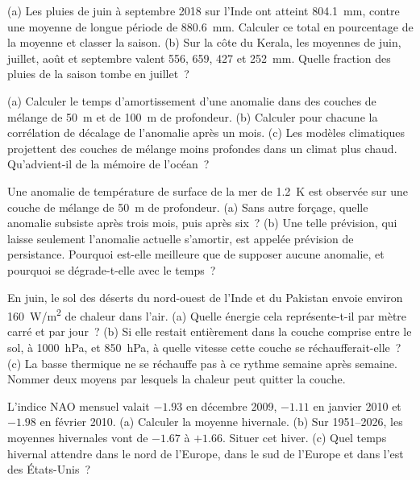 \begin{exercise}[$\star$]\label{exo:b2:climate-variability:4}
(a) Les pluies de juin à septembre 2018 sur l'Inde ont atteint \qty{804.1}{mm}, contre une moyenne de longue période
de \qty{880.6}{mm}. Calculer ce total en pourcentage de la moyenne et classer la saison. (b) Sur la côte du Kerala,
les moyennes de juin, juillet, août et septembre valent 556, 659, 427 et \qty{252}{mm}.
Quelle fraction des pluies de la saison tombe en juillet~?
\end{exercise}

\begin{exercise}[$\star\star$]\label{exo:b2:climate-variability:5}
(a) Calculer le temps d'amortissement d'une anomalie dans des couches de mélange de \qty{50}{m} et de \qty{100}{m} de profondeur.
(b) Calculer pour chacune la corrélation de décalage de l'anomalie après un mois. (c) Les modèles climatiques
projettent des couches de mélange moins profondes dans un climat plus chaud. Qu'advient-il de la mémoire
de l'océan~?
\end{exercise}

\begin{exercise}[$\star\star$]\label{exo:b2:climate-variability:6}
Une anomalie de température de surface de la mer de \qty{+1.2}{K} est observée sur une couche de mélange
de \qty{50}{m} de profondeur. (a) Sans autre forçage, quelle anomalie subsiste après trois mois, puis après six~?
(b) Une telle prévision, qui laisse seulement l'anomalie actuelle s'amortir, est appelée prévision de persistance.
Pourquoi est-elle meilleure que de supposer aucune anomalie, et pourquoi se dégrade-t-elle avec le temps~?
\end{exercise}

\begin{exercise}[$\star\star$]\label{exo:b2:climate-variability:7}
En juin, le sol des déserts du nord-ouest de l'Inde et du Pakistan envoie environ
\qty{160}{W/m^2} de chaleur dans l'air. (a) Quelle énergie cela représente-t-il par mètre carré et par jour~?
(b) Si elle restait entièrement dans la couche comprise entre le sol, à \qty{1000}{hPa}, et \qty{850}{hPa},
à quelle vitesse cette couche se réchaufferait-elle~? (c) La basse thermique ne se réchauffe pas à ce rythme
semaine après semaine. Nommer deux moyens par lesquels la chaleur peut quitter la couche.
\end{exercise}

\begin{exercise}[$\star\star$]\label{exo:b2:climate-variability:8}
L'indice NAO mensuel valait $-1.93$ en décembre 2009, $-1.11$ en janvier 2010 et $-1.98$ en
février 2010. (a) Calculer la moyenne hivernale. (b) Sur 1951--2026, les moyennes hivernales vont de $-1.67$ à $+1.66$.
Situer cet hiver. (c) Quel temps hivernal attendre dans le nord de l'Europe, dans le sud de l'Europe
et dans l'est des États-Unis~?
\end{exercise}


